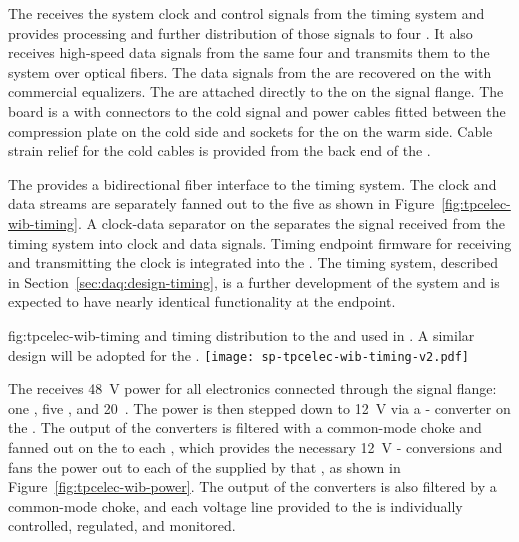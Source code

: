 The  
receives the system clock and control signals from the
timing system and provides processing and further distribution of those signals to four
. 
It also receives high-speed data signals from the same four 
 and transmits them to the  system over optical
fibers. The data signals from the  are recovered on the  with commercial 
equalizers. The  are attached directly to the 
 \fdth on the signal flange. The \fdth board is a  
with connectors to the cold signal and  power cables fitted
between the compression plate on the cold side and sockets for
the  on the warm side. Cable strain relief for the cold cables is 
provided from the back end of the \fdth.

The  provides a bidirectional fiber interface to the
timing system. The clock and data streams are separately fanned out to the 
five  as shown in Figure~\ref{fig:tpcelec-wib-timing}. 
A clock-data separator on the 
 separates the signal received from the timing system into 
clock and data signals.
Timing endpoint firmware for receiving and transmitting 
the clock is integrated into the  .
The  timing system, described in Section~\ref{sec:daq:design-timing}, 
is a further development of the  system and is expected to have nearly identical 
functionality at the  endpoint.

\begin{dunefigure}
{fig:tpcelec-wib-timing}
{ and timing distribution to the  and  used in .
A similar design will be adopted for the  .}
\texttt{[image: sp-tpcelec-wib-timing-v2.pdf]}
\end{dunefigure}

The  receives \SI{48}{V}  power for all  
electronics connected through the  signal flange: 
one , five , and \num{20}~. 
The  power is then stepped down to \SI{12}{V} via 
a - converter on the . The output 
of the  converters is filtered with a common-mode choke 
and fanned out on the  to each , which provides the 
necessary \SI{12}{V} - conversions and fans
the  power out to each of the   supplied 
by that , as shown in Figure~\ref{fig:tpcelec-wib-power}. 
The output of the  converters is also filtered by a 
common-mode choke, and each voltage line provided to the 
is individually controlled, regulated, and monitored.

